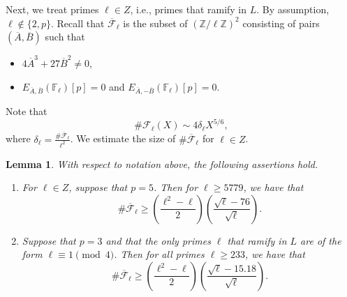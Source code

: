 \documentclass[12pt]{amsart}
\newtheorem{lemma}[theorem]{Lemma}
\newcommand{\cF}{\mathcal{F}}
\newcommand{\Z}{\mathbb{Z}}
\newcommand{\F}{\mathbb{F}}
\numberwithin{equation}{section}
\begin{document}
Next, we treat primes $\ell\in Z$, i.e., primes that ramify in $L$. By assumption, $\ell\notin \{2, p\}$. Recall that $\overline{\cF}_\ell$ is the subset of $(\Z/\ell\Z)^2$ consisting of pairs $(\overline{A}, \overline{B})$ such that 
\begin{itemize}
    \item $4 \overline{A}^3+27 \overline{B}^2\neq 0$, 
    \item $E_{\overline{A}, \overline{B}}(\F_\ell)[p]=0$ and $E_{\overline{A}, -\overline{B}}(\F_\ell)[p]=0$.
\end{itemize}
Note that \[\# \cF_\ell(X)\sim 4\delta_\ell X^{5/6},\] where $\delta_\ell=\frac{\# \overline{\cF}_\ell}{\ell^2}$. We estimate the size of $\# \overline{\cF}_\ell$ for $\ell\in Z$.

\begin{lemma}\label{howe lemma}
    With respect to notation above, the following assertions hold. 
    \begin{enumerate}
        \item For $\ell\in Z$, suppose that $p=5$. Then for $\ell\geq 5779$, we have that 
    \[\# \overline{\cF}_\ell\geq \left(\frac{\ell^2-\ell}{2}\right)\left( \frac{\sqrt{\ell}-76}{\sqrt{\ell}}\right). \]
    \item Suppose that $p=3$ and that the only primes $\ell$ that ramify in $L$ are of the form $\ell\equiv 1\pmod{4}$. Then for all primes $\ell\geq 233$, we have that 
    \[\# \overline{\cF}_\ell\geq \left(\frac{\ell^2-\ell}{2}\right)\left(\frac{\sqrt{\ell}-15.18}{\sqrt{\ell}}\right).\]
    \end{enumerate}

    
\end{lemma}
\end{document}
